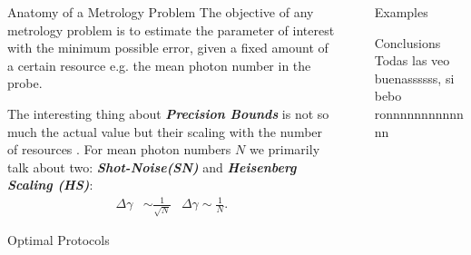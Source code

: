 \documentclass[final]{beamer}
\newlength{\sepwidth}
\newlength{\colwidth}
\newcommand{\separatorcolumn}{\begin{column}{\sepwidth}\end{column}}
\begin{document}
\begin{frame}[t]
\begin{columns}[t]
\begin{column}{\colwidth}
 \begin{block}{Anatomy of a Metrology Problem}
   The objective of any metrology problem is to estimate the parameter of interest with the minimum possible error, given a fixed amount of a
   certain resource e.g. the mean photon number in the probe.
   \vspace{-0.07\linewidth}
   
 \end{block}
   \vspace{-0.07\linewidth}
   The interesting thing about \textbf{\textit{Precision Bounds}} is not so much the actual value but their scaling with the number of resources
   . For mean photon numbers $N$ we primarily talk about two: \textbf{\textit{Shot-Noise(SN)}} and \textbf{\textit{Heisenberg Scaling (HS)}}:
 {\Large
  \begin{align*}
    \Delta \gamma &\sim \frac{1}{\sqrt{N}} & \Delta \gamma \sim \frac{1}{N}.
  \end{align*}
}
\begin{block}{Optimal Protocols}

\end{block}


\end{column}

\separatorcolumn

\begin{column}{\colwidth}


\begin{block}{Examples}



\end{block}

   \begin{block}{Conclusions}
     Todas las veo buenassssss, si bebo ronnnnnnnnnnnnn
  \end{block}



\end{column}
\end{columns}
\end{frame}
\end{document}
